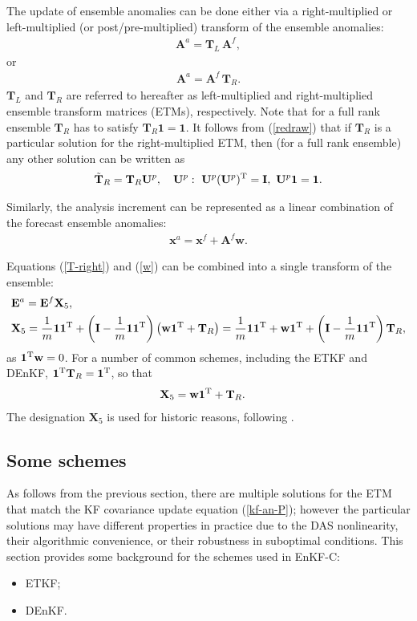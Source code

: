 \documentclass[11pt]{report}
\newcommand{\mb} {\mathbf}
\newcommand{\T}{^{\tiny \mathrm T}}
\begin{document}
The update of ensemble anomalies can be done either via a right-multiplied or left-multiplied (or post/pre-multiplied) transform of the ensemble anomalies:
\begin{align}
  \label{T-left}
  \mb A^a = \mb T_L \,\mb A^f,
\end{align}
or
\begin{align}
  \label{T-right}
  \mb A^a = \mb A^f \, \mb T_R.
\end{align}
$\mb T_L$ and $\mb T_R$ are referred to hereafter as left-multiplied and right-multiplied ensemble transform matrices (ETMs), respectively.
Note that for a full rank ensemble $\mb T_R$ has to satisfy $\mb T_R \mb 1 = \mb 1$.
It follows from (\ref{redraw}) that if $\mb T_R$ is a particular solution for the right-multiplied ETM, then (for a full rank ensemble) any other solution can be written as
\begin{align}
  \tilde{\mb T}_R = \mb T_R \mb U^p, \quad \mb U^p:\ \mb U^p (\mb U^p)\T = \mb I,\ \mb U^p \mb 1 = \mb 1.
\end{align}

Similarly, the analysis increment can be represented as a linear combination of the forecast ensemble anomalies:
\begin{align}
  \label{w}
  \mb x^a = \mb x^f + \mb A^f \mb w.
\end{align}

Equations (\ref{T-right}) and (\ref{w}) can be combined into a single transform of the ensemble:
\begin{align}
  \label{x5-def}
  & \mb E^a = \mb E^f \mb X_5,\\
  & \mb X_5 = \frac{1}{m} \mb 1 \mb 1\T + \left( \mb I - \frac{1}{m} \mb 1 \mb 1\T\right) \left( \mb w \mb 1\T + \mb T_R\right)
  = \frac{1}{m} \mb 1 \mb 1\T + \mb w \mb 1\T + \left( \mb I - \frac{1}{m} \mb 1 \mb 1\T \right) \mb T_R,
\end{align}
as $\mb 1\T \mb w = 0$. 
For a number of common schemes, including the ETKF and DEnKF, $\mb 1\T \mb T_R = \mb 1\T$, so that
\begin{align}
  \label{x5}
  & \mb X_5 = \mb w \mb 1\T + \mb T_R.
\end{align}
The designation $\mb X_5$ is used for historic reasons, following \citet{eve03a}.

\subsection{Some schemes}

As follows from the previous section, there are multiple solutions for the ETM that match the KF covariance update equation (\ref{kf-an-P}); however the particular solutions may have different properties in practice due to the DAS nonlinearity, their algorithmic convenience, or their robustness in suboptimal conditions.
This section provides some background for the schemes used in EnKF-C:
\begin{itemize}
\item ETKF;
\item DEnKF.
\end{itemize}
\end{document}
